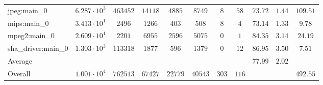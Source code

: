 \begin{tabular}{|l|c|c|c|c|c|c|c|c|c|c|}
jpeg:main\_0            & $ 6.287 \cdot 10^{3} $ & $ 463452 $ & $ 14118 $ & $ 4885  $ & $ 8749  $ & $ 8   $ & $ 58  $ & $ 73.72       $ & $ 1.44    $ & $ 109.51  $ \\
mips:main\_0            & $ 3.413 \cdot 10^{1} $ & $ 2496   $ & $ 1266  $ & $ 403   $ & $ 508   $ & $ 8   $ & $ 4   $ & $ 73.14       $ & $ 1.33    $ & $ 9.78    $ \\
mpeg2:main\_0           & $ 2.609 \cdot 10^{1} $ & $ 2201   $ & $ 6955  $ & $ 2596  $ & $ 5075  $ & $ 0   $ & $ 1   $ & $ 84.35       $ & $ 3.14    $ & $ 24.19   $ \\
sha\_driver:main\_0     & $ 1.303 \cdot 10^{3} $ & $ 113318 $ & $ 1877  $ & $ 596   $ & $ 1379  $ & $ 0   $ & $ 12  $ & $ 86.95       $ & $ 3.50    $ & $ 7.51    $ \\
\hline
Average                 & $                    $ & $        $ & $       $ & $       $ & $       $ & $     $ & $     $ & $ 77.99       $ & $ 2.02    $ & $         $ \\
\hline
Overall                 & $ 1.001 \cdot 10^{4} $ & $ 762513 $ & $ 67427 $ & $ 22779 $ & $ 40543 $ & $ 303 $ & $ 116 $ & $             $ & $         $ & $ 492.55  $ \\
\hline
\end{tabular}
